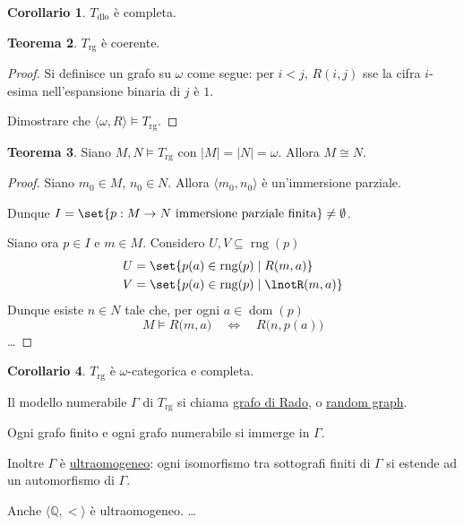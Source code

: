 \documentclass[10pt]{article}
\newcommand{\card}[1]{\left\vert #1 \right\vert}
\newcommand{\1}{\mathds{1}}
\newcommand{\Q}{\mathds{Q}}
\theoremstyle{definition}%
\newtheorem{thm}{Teorema}[section]
\newtheorem{cor}[thm]{Corollario}
\theoremstyle{plain}
\theoremstyle{remark}
\newcommand{\Tdlo}{T_{\text{dlo}}}
\newcommand{\Trg}{T_{\text{rg}}}
\begin{document}
\begin{cor}
\(\Tdlo\) è completa.
\end{cor}

\begin{thm}
\(\Trg\) è coerente.
\end{thm}

\begin{proof}
Si definisce un grafo su \(\omega\) come segue: per \(i<j\), \(R(i,j)\) sse la cifra \(i\)-esima nell'espansione binaria di \(j\) è \(1\).

Dimostrare che \(\langle \omega,R\rangle \vDash \Trg\).
\end{proof}

\begin{thm}
Siano \(M,N\vDash \Trg\) con \(\card{M}=\card{N}=\omega\). Allora \(M\cong N\).
\end{thm}

\begin{proof}
Siano \(m_{0} \in M\), \(n_{0} \in N\). Allora \(\langle m_{0},n_{0}\rangle\) è un'immersione parziale.

Dunque \(I=\set{p:M\to N\text{ immersione parziale finita}}\neq \emptyset\).

Siano ora \(p \in I\) e \(m \in M\). Considero \(U,V \subseteq \operatorname{rng}(p)\)
\begin{align*}
U&=\set{p(a) \in \operatorname{rng}(p)\mid R(m,a)}\\
V&=\set{p(a) \in \operatorname{rng}(p)\mid \lnotR(m,a)}
\end{align*}
Dunque esiste \(n \in N\) tale che, per ogni \(a \in \operatorname{dom}(p)\)
\begin{equation*}
M\vDash R\big(m,a\big)\quad\iff\quad R\big(n,p(a)\big)
\end{equation*}
\ldots{}
\end{proof}

\begin{cor}
\(\Trg\) è \(\omega\)-categorica e completa.
\end{cor}

Il modello numerabile \(\Gamma\) di \(\Trg\) si chiama \uline{grafo di Rado}, o \uline{random graph}.

Ogni grafo finito e ogni grafo numerabile si immerge in \(\Gamma\).

Inoltre \(\Gamma\) è \uline{ultraomogeneo}: ogni isomorfismo tra sottografi finiti di \(\Gamma\) si estende ad un automorfismo di \(\Gamma\).

Anche \(\langle\Q,<\rangle\) è ultraomogeneo. \ldots{}
\end{document}
